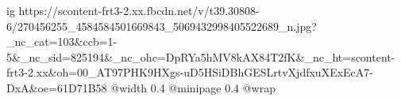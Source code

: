  
 
 
 
 

\ifcmt
  ig https://scontent-frt3-2.xx.fbcdn.net/v/t39.30808-6/270456255_4584584501669843_5069432998405522689_n.jpg?_nc_cat=103&ccb=1-5&_nc_sid=825194&_nc_ohc=DpRYa5hMV8kAX84T2fK&_nc_ht=scontent-frt3-2.xx&oh=00_AT97PHK9HXgs-uD5HSiDBhGESLrtvXjdfxuXExEcA7-DxA&oe=61D71B58
  @width 0.4
  @minipage 0.4
  @wrap \parpic[r]
\fi
